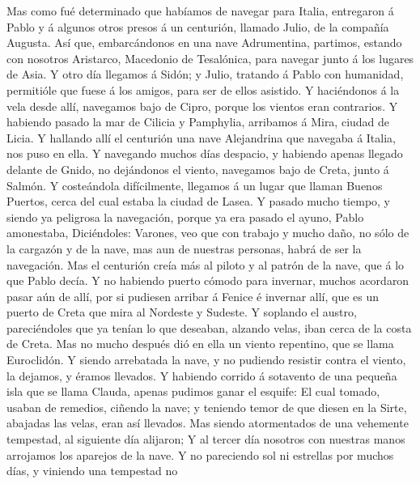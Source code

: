  Mas como fué determinado que habíamos de navegar para
Italia, entregaron á Pablo y á algunos otros presos á un centurión,
llamado Julio, de la compañía Augusta.  Así que,
embarcándonos en una nave Adrumentina, partimos, estando con nosotros
Aristarco, Macedonio de Tesalónica, para navegar junto á los lugares de
Asia.  Y otro día llegamos á Sidón; y Julio, tratando á
Pablo con humanidad, permitióle que fuese á los amigos, para ser de
ellos asistido.  Y haciéndonos á la vela desde allí,
navegamos bajo de Cipro, porque los vientos eran contrarios.
 Y habiendo pasado la mar de Cilicia y Pamphylia,
arribamos á Mira, ciudad de Licia.  Y hallando allí el
centurión una nave Alejandrina que navegaba á Italia, nos puso en ella.
 Y navegando muchos días despacio, y habiendo apenas
llegado delante de Gnido, no dejándonos el viento, navegamos bajo de
Creta, junto á Salmón.  Y costeándola difícilmente,
llegamos á un lugar que llaman Buenos Puertos, cerca del cual estaba la
ciudad de Lasea.  Y pasado mucho tiempo, y siendo ya
peligrosa la navegación, porque ya era pasado el ayuno, Pablo
amonestaba,  Diciéndoles: Varones, veo que con trabajo y
mucho daño, no sólo de la cargazón y de la nave, mas aun de nuestras
personas, habrá de ser la navegación.  Mas el centurión
creía más al piloto y al patrón de la nave, que á lo que Pablo decía.
 Y no habiendo puerto cómodo para invernar, muchos
acordaron pasar aún de allí, por si pudiesen arribar á Fenice é invernar
allí, que es un puerto de Creta que mira al Nordeste y Sudeste.
 Y soplando el austro, pareciéndoles que ya tenían lo que
deseaban, alzando velas, iban cerca de la costa de Creta.
 Mas no mucho después dió en ella un viento repentino,
que se llama Euroclidón.  Y siendo arrebatada la nave, y
no pudiendo resistir contra el viento, la dejamos, y éramos llevados.
 Y habiendo corrido á sotavento de una pequeña isla que
se llama Clauda, apenas pudimos ganar el esquife:  El
cual tomado, usaban de remedios, ciñendo la nave; y teniendo temor de
que diesen en la Sirte, abajadas las velas, eran así llevados.
 Mas siendo atormentados de una vehemente tempestad, al
siguiente día alijaron;  Y al tercer día nosotros con
nuestras manos arrojamos los aparejos de la nave.  Y no
pareciendo sol ni estrellas por muchos días, y viniendo una tempestad no
